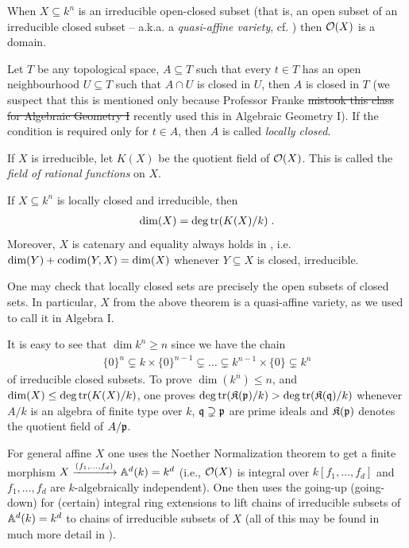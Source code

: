 \documentclass[a4paper,parskip=half,numbers=enddot, DIV=12]{scrreprt}
\begin{document}
\begin{rem}
	When $X\subseteq k^n$ is an irreducible open-closed subset (that is, an open subset of an irreducible closed subset -- a.k.a. a \emph{quasi-affine variety}, cf. \cite[Definition~2.2.1]{alg1}) then $\mathcal{O}(X)$ is a domain. 
\end{rem}
\begin{rem}
	Let $T$ be any topological space, $A\subseteq T$ such that every $t\in T$ has an open neighbourhood $U\subseteq T$ such that $A\cap U$ is closed in $U$, then $A$ is closed in $T$ (we suspect that this is mentioned only because Professor Franke \sout{mistook this class for Algebraic Geometry I} recently used this in Algebraic Geometry I). If the condition is required only for $t\in A$, then $A$ is called \emph{locally closed}.
\end{rem}
If $X$ is irreducible, let $K(X)$ be the quotient field of $\mathcal{O}(X)$. This is called the \emph{field of rational functions} on $X$.
\begin{thm}
	If $X\subseteq k^n$ is locally closed and irreducible, then
	\begin{align*}
	\dim(X) = \deg\operatorname{tr} (K(X)/k)\;.
	\end{align*}
	Moreover, $X$ is catenary and equality always holds in , i.e. $\dim (Y) +\operatorname{codim}(Y,X) = \dim (X)$ whenever $Y\subseteq X$ is closed, irreducible.
\end{thm}
One may check that locally closed sets are precisely the open subsets of closed sets. In particular, $X$ from the above theorem is a quasi-affine variety, as we used to call it in Algebra I.
\begin{rem}
	It is easy to see that $\dim k^n \geq n$ since we have the chain
	\begin{align*}
	\{0\}^n \subsetneq k\times\{0\}^{n-1} \subsetneq\ldots\subsetneq k^{n-1}\times\{0\} \subsetneq k^n
	\end{align*} of irreducible closed subsets. To prove $\dim(k^n) \leq n$, and $\dim (X) \leq\deg\operatorname{tr}(K(X)/k)$, one proves $\deg\operatorname{tr}(\mathfrak{K}(\mathfrak{p})/k) > \deg\operatorname{tr}(\mathfrak{K}(\mathfrak{q})/k)$ whenever $A/k$ is an algebra of finite type over $k$, $\mathfrak{q}\supsetneq \mathfrak{p}$ are prime ideals and $\mathfrak{K}(\mathfrak{p})$ denotes the quotient field of $A/\mathfrak{p}$. 
	
	For general affine $X$ one uses the Noether Normalization theorem to get a finite morphism $X\xrightarrow{(f_1,\ldots,f_d)} \mathbb{A}^d(k)=k^d$ (i.e., $\mathcal{O}(X)$ is integral over $k[f_1,\ldots,f_d]$ and $f_1,\ldots,f_d$ are $k$-algebraically independent). One then uses the going-up (going-down) for (certain) integral ring extensions to lift chains of irreducible subsets of $\mathbb{A}^d(k)=k^d$ to chains of irreducible subsets of $X$ (all of this may be found in much more detail in \cite[Section~2.4-2.6]{alg1}).
\end{rem}
\end{document}
